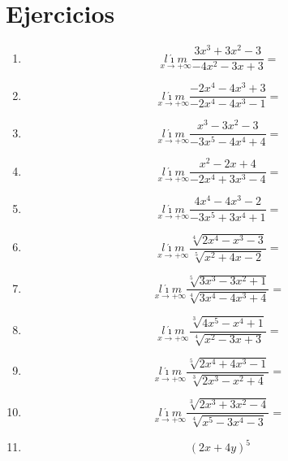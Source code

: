 \documentclass[oneside,spanish,letter]{article}
\begin{document}
\section{Ejercicios}
\begin{enumerate}
 \item $$\underset{x\rightarrow +\infty}{l\acute{\imath}m} \frac{3x^3+3x^2-3}{-4x^2-3x+3}=$$
 \item $$\underset{x\rightarrow +\infty}{l\acute{\imath}m} \frac{-2x^4-4x^3+3}{-2x^4-4x^3-1}=$$
 \item $$\underset{x\rightarrow +\infty}{l\acute{\imath}m} \frac{x^3-3x^2-3}{-3x^5-4x^4+4}=$$
 \item $$\underset{x\rightarrow +\infty}{l\acute{\imath}m} \frac{x^2-2x+4}{-2x^4+3x^3-4}=$$
 \item $$\underset{x\rightarrow +\infty}{l\acute{\imath}m} \frac{4x^4-4x^3-2}{-3x^5+3x^4+1}=$$
 \item $$\underset{x\rightarrow +\infty}{l\acute{\imath}m} \frac{\sqrt[4]{2x^4-x^3-3}}{\sqrt[5]{x^2+4x-2}}=$$
 \item $$\underset{x\rightarrow +\infty}{l\acute{\imath}m} \frac{\sqrt[5]{3x^3-3x^2+1}}{\sqrt[4]{3x^4-4x^3+4}}=$$
 \item $$\underset{x\rightarrow +\infty}{l\acute{\imath}m} \frac{\sqrt[3]{4x^5-x^4+1}}{\sqrt[4]{x^2-3x+3}}=$$
 \item $$\underset{x\rightarrow +\infty}{l\acute{\imath}m} \frac{\sqrt[5]{2x^4+4x^3-1}}{\sqrt[3]{2x^3-x^2+4}}=$$
 \item $$\underset{x\rightarrow +\infty}{l\acute{\imath}m} \frac{\sqrt[3]{2x^3+3x^2-4}}{\sqrt[4]{x^5-3x^4-3}}=$$
\item $$(2x+4y)^5$$
 \end{enumerate}
  \newpage
\end{document}

